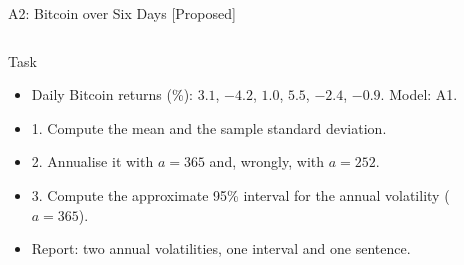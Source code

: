 \begin{frame}{A2: Bitcoin over Six Days [Proposed]}
\propsub
\itemsize{\scriptsize}
\begin{columns}[T]
\begin{column}{\taskw}
\begin{block}{Task}
\begin{itemize}
    \item Daily Bitcoin returns (\%): $3.1$, $-4.2$, $1.0$, $5.5$, $-2.4$, $-0.9$. Model: A1.
    \item 1. Compute the mean and the sample standard deviation.
    \item 2. Annualise it with $a = 365$ and, wrongly, with $a = 252$.
    \item 3. Compute the approximate 95\% interval for the annual volatility ($a = 365$).
    \item Report: two annual volatilities, one interval and one sentence.
\end{itemize}
\end{block}
\end{column}
\begin{column}{\solw}
\end{column}
\end{columns}
\end{frame}

